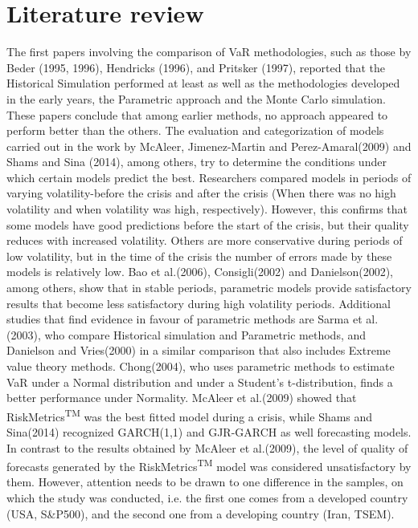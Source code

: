 \documentclass[a4paper,11pt,oneside]{book}
\begin{document}



\section{Literature review}

The first papers involving the comparison of VaR methodologies, such as those by Beder (1995, 1996), Hendricks (1996), and
Pritsker (1997), reported that the Historical Simulation performed at least as well as the methodologies developed in the early years, the Parametric approach and the Monte Carlo simulation. These papers conclude that among earlier methods, no approach appeared to perform better than the
others. The evaluation and categorization of models carried out in the work by McAleer, Jimenez-Martin and Perez-Amaral(2009) and Shams and Sina (2014), among others, try to determine the conditions under which certain models predict the best. Researchers compared models in periods of varying volatility-before the crisis and after the crisis (When there was no high volatility and when volatility was high, respectively). However, this confirms that some models have good predictions before the start of the crisis, but their quality reduces with increased volatility. Others are more conservative during periods of low volatility, but in the time of the crisis the number of errors made by these models is relatively low.
\newline\newline
Bao et al.(2006), Consigli(2002) and Danielson(2002), among
others, show that in stable periods, parametric models provide satisfactory results
that become less satisfactory during high volatility periods.  Additional studies that find
evidence in favour of parametric methods are Sarma et al.(2003), who compare
Historical simulation and Parametric methods, and Danielson and Vries(2000) in a
similar comparison that also includes Extreme value theory methods. Chong(2004),
who uses parametric methods to estimate VaR under a Normal distribution and under a
Student’s t-distribution, finds a better performance under Normality. McAleer et al.(2009) showed that RiskMetrics\textsuperscript{TM} was
the best fitted model during a crisis, while Shams and Sina(2014) recognized GARCH(1,1) and GJR-GARCH as well
forecasting models. In contrast to the results obtained
by McAleer et al.(2009), the level of quality of forecasts
generated by the RiskMetrics\textsuperscript{TM} model was considered
unsatisfactory by them. However, attention needs to be
drawn to one difference in the samples, on which the
study was conducted, i.e. the first one comes from a
developed country (USA, S\&P500), and the second one
from a developing country (Iran, TSEM).
\newline\newline
\end{document}
